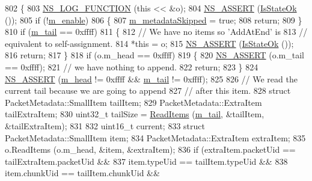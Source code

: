 \begin{DoxyCode}
802 \{
803   \hyperlink{log-macros-disabled_8h_a90b90d5bad1f39cb1b64923ea94c0761}{NS\_LOG\_FUNCTION} (\textcolor{keyword}{this} << &o);
804   \hyperlink{assert_8h_a6dccdb0de9b252f60088ce281c49d052}{NS\_ASSERT} (\hyperlink{classns3_1_1PacketMetadata_a208d3163e28704438cdd4d30318e489c}{IsStateOk} ());
805   \textcolor{keywordflow}{if} (!\hyperlink{classns3_1_1PacketMetadata_a666ea556ffbd8f2226195cde1abe7ae7}{m\_enable}) 
806     \{
807       \hyperlink{classns3_1_1PacketMetadata_ac370960e8881e5a7280122e9dc5f7ace}{m\_metadataSkipped} = \textcolor{keyword}{true};
808       \textcolor{keywordflow}{return};
809     \}
810   \textcolor{keywordflow}{if} (\hyperlink{classns3_1_1PacketMetadata_ad24a659e236af7b98c475c97c4f60db9}{m\_tail} == 0xffff)
811     \{
812       \textcolor{comment}{// We have no items so 'AddAtEnd' is }
813       \textcolor{comment}{// equivalent to self-assignment.}
814       *\textcolor{keyword}{this} = o;
815       \hyperlink{assert_8h_a6dccdb0de9b252f60088ce281c49d052}{NS\_ASSERT} (\hyperlink{classns3_1_1PacketMetadata_a208d3163e28704438cdd4d30318e489c}{IsStateOk} ());
816       \textcolor{keywordflow}{return};
817     \}
818   \textcolor{keywordflow}{if} (o.m\_head == 0xffff)
819     \{
820       \hyperlink{assert_8h_a6dccdb0de9b252f60088ce281c49d052}{NS\_ASSERT} (o.m\_tail == 0xffff);
821       \textcolor{comment}{// we have nothing to append.}
822       \textcolor{keywordflow}{return};
823     \}
824   \hyperlink{assert_8h_a6dccdb0de9b252f60088ce281c49d052}{NS\_ASSERT} (\hyperlink{classns3_1_1PacketMetadata_a46b3ef0a9a80a798ad1e81b5694a5658}{m\_head} != 0xffff && \hyperlink{classns3_1_1PacketMetadata_ad24a659e236af7b98c475c97c4f60db9}{m\_tail} != 0xffff);
825 
826   \textcolor{comment}{// We read the current tail because we are going to append}
827   \textcolor{comment}{// after this item.}
828   \textcolor{keyword}{struct }PacketMetadata::SmallItem tailItem;
829   PacketMetadata::ExtraItem tailExtraItem;
830   uint32\_t tailSize = \hyperlink{classns3_1_1PacketMetadata_a3719ad2c32313a9a1c74462322e8b517}{ReadItems} (\hyperlink{classns3_1_1PacketMetadata_ad24a659e236af7b98c475c97c4f60db9}{m\_tail}, &tailItem, &tailExtraItem);
831 
832   uint16\_t current;
833   \textcolor{keyword}{struct }PacketMetadata::SmallItem item;
834   PacketMetadata::ExtraItem extraItem;
835   o.ReadItems (o.m\_head, &item, &extraItem);
836   \textcolor{keywordflow}{if} (extraItem.packetUid == tailExtraItem.packetUid &&
837       item.typeUid == tailItem.typeUid &&
838       item.chunkUid == tailItem.chunkUid &&

\end{DoxyCode}
